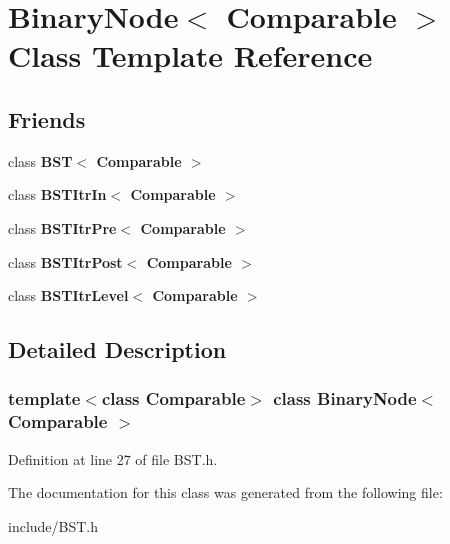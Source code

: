 \hypertarget{classBinaryNode}{}\section{Binary\+Node$<$ Comparable $>$ Class Template Reference}
\label{classBinaryNode}
\subsection*{Friends}
\begin{DoxyCompactItemize}
\item 
\mbox{\label{classBinaryNode_a28a1adb9906f3ff7e12c2cb6fa2bd54e}} 
class {\bfseries B\+S\+T$<$ Comparable $>$}
\item 
\mbox{\label{classBinaryNode_aab3993acac2ab24a0b59edb0c3acc775}} 
class {\bfseries B\+S\+T\+Itr\+In$<$ Comparable $>$}
\item 
\mbox{\label{classBinaryNode_a45a55df6f11541416d4ea7684c575c1a}} 
class {\bfseries B\+S\+T\+Itr\+Pre$<$ Comparable $>$}
\item 
\mbox{\label{classBinaryNode_a5dc153694be266f6e772659486219da7}} 
class {\bfseries B\+S\+T\+Itr\+Post$<$ Comparable $>$}
\item 
\mbox{\label{classBinaryNode_a26ff00bc0d87069aed877f10fd3c80a8}} 
class {\bfseries B\+S\+T\+Itr\+Level$<$ Comparable $>$}
\end{DoxyCompactItemize}


\subsection{Detailed Description}
\subsubsection*{template$<$class Comparable$>$\newline
class Binary\+Node$<$ Comparable $>$}



Definition at line 27 of file B\+S\+T.\+h.



The documentation for this class was generated from the following file\+:\begin{DoxyCompactItemize}
\item 
include/B\+S\+T.\+h\end{DoxyCompactItemize}
